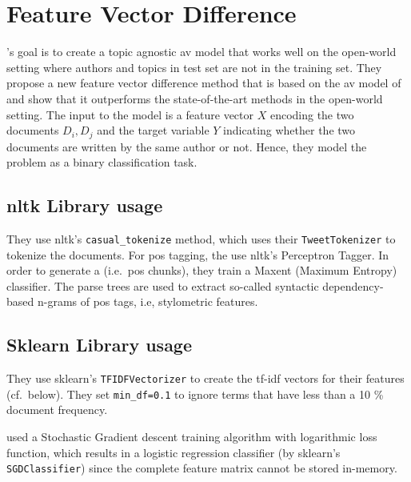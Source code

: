 \section{Feature Vector Difference}
\label{sec:feature_vector_difference}

\citet{weerasinghe_feature_vector_difference_2021}'s goal is to create a topic agnostic \ac{av} model that works well on the open-world setting 
where authors and topics in test set are not in the training set. They propose a new feature vector difference method that is based on the \ac{av} model of \citet{stamatatos_2020} and show that it outperforms the state-of-the-art methods in the open-world setting.
The input to the model is a feature vector $X$ encoding the two documents $D_i,D_j$ 
and the target variable $Y$ indicating whether the two documents are written by the same author or not. 
Hence, they model the problem as a binary classification task.

\subsection{\ac{nltk} Library usage}
They use \ac{nltk}'s \texttt{casual\_tokenize} method, which uses their \texttt{TweetTokenizer} to tokenize the documents.
For \ac{pos} tagging, the use \ac{nltk}'s Perceptron Tagger.
In order to generate a  (i.e.\ \ac{pos} chunks), they train a Maxent (Maximum Entropy) classifier.
The parse trees are used to extract so-called syntactic dependency-based n-grams of \ac{pos} tags, i.e, stylometric features.

\subsection{Sklearn Library usage}
They use \ac{sklearn}'s \texttt{TFIDFVectorizer} to create the \ac{tf-idf} vectors for their features (cf.~below).
They set \texttt{min\_df=0.1} to ignore terms that have less than a 10 \% document frequency.

\citet{weerasinghe_feature_vector_difference_2021} used a Stochastic Gradient descent training algorithm with logarithmic loss function, 
which results in a logistic regression classifier (by sklearn's  \texttt{SGDClassifier}) since the complete feature matrix cannot be stored in-memory.

